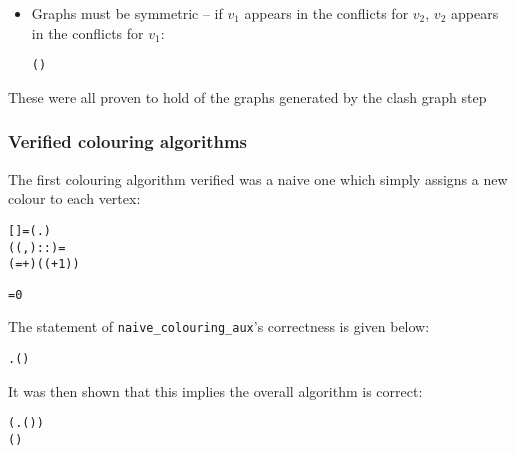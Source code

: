 \documentclass{beamer}
\begin{document}
\begin{frame}[containsverbatim]
\begin{itemize}
	\item Graphs must be symmetric -- if $v_1$ appears in the conflicts for $v_2$, $v_2$ appears in the conflicts for $v_1$:
	
	\begin{alltt}\small
		\HOLTokenTurnstile{}   \HOLTokenImp{}
    (  )
	\end{alltt}
\end{itemize}

These were all proven to hold of the graphs generated by the clash graph step
\end{frame}

\begin{frame}[containsverbatim]
\frametitle{Verified colouring algorithms}
The first colouring algorithm verified was a naive one which simply assigns a new colour to each vertex:

\begin{alltt}\small
	  = (\HOLTokenLambda{}. )
 ((,)::)  =
( =+ ) (  ( + 1))
\end{alltt}

\begin{alltt}\small
	  =   0
\end{alltt}

The statement of \texttt{naive_colouring_aux}'s correctness is given below:

\begin{alltt}\small
	\HOLTokenTurnstile{}   \HOLTokenImp{}
   \HOLTokenForall{}.  (  ) 
\end{alltt}

It was then shown that this implies the overall algorithm is correct:

\begin{alltt}\small
	\HOLTokenTurnstile{} (\HOLTokenForall{}.  (  ) ) \HOLTokenImp{}
    ( ) 
\end{alltt}
\end{frame}
\end{document}
